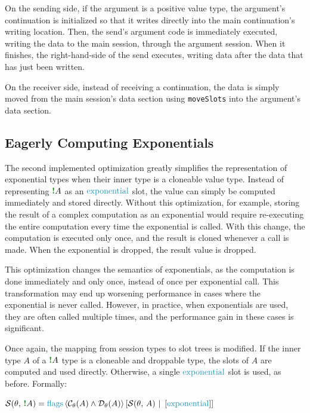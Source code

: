 On the sending side, if the argument is a positive value type, the argument's continuation is initialized so that it writes directly into the main continuation's writing location. Then, the send's argument code is immediately executed, writing the data to the main session, through the argument session. When it finishes, the right-hand-side of the send executes, writing data after the data that has just been written.

On the receiver side, instead of receiving a continuation, the data is simply moved from the main session's data section using \texttt{moveSlots} into the argument's data section.

\subsection{Eagerly Computing Exponentials} \label{subsection:ExponentialValueOptimizations}

The second implemented optimization greatly simplifies the representation of exponential types when their inner type is a cloneable value type. Instead of representing $\bangt{A}$ as an $\exponentials$ slot, the value can simply be computed immediately and stored directly. Without this optimization, for example, storing the result of a complex computation as an exponential would require re-executing the entire computation every time the exponential is called. With this change, the computation is executed only once, and the result is cloned whenever a call is made. When the exponential is dropped, the result value is dropped.

This optimization changes the semantics of exponentials, as the computation is done immediately and only once, instead of once per exponential call. This transformation may end up worsening performance in cases where the exponential is never called. However, in practice, when exponentials are used, they are often called multiple times, and the performance gain in these cases is significant.

Once again, the mapping from session types to slot trees is modified. If the inner type $A$ of a $\bangt{A}$ type is a cloneable and droppable type, the slots of $A$ are computed and used directly. Otherwise, a single $\exponentials$ slot is used, as before. Formally:\vspace{2pt}\\
\vspace{2pt}\centerline{$
    \slots{\theta}{\bangt{A}} = \flagsst{\iscloneable{A} \land \isdroppable{A}}{\slots{\theta}{A}}{\seqst{\exponentials}}
$}

